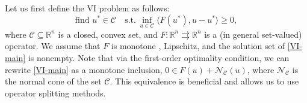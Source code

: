 \documentclass[letterpaper, 10 pt, conference]{ieeeconf}  %
\newcommand{\R}{\mathbb{R}}
\begin{document}
Let us first define the VI problem as follows:
\begin{equation}\label{VI-main}
\text{find} \,\, u^* \in \mathcal{C} \quad \text{s.t.} \, \inf\limits_{u\in \mathcal{C}}\langle F(u^*), u - u^* \rangle \geq 0,
\end{equation}
where $\mathcal{C}\subseteq\R^n$ is a closed, convex set, and $F:\R^n\rightrightarrows \R^n$ is a (in general set-valued) operator. We assume that $F$ is monotone \cite{facchinei2003finite}, Lipschitz, and the solution set of \eqref{VI-main} is nonempty. Note that via the first-order optimality condition, we can rewrite \eqref{VI-main} as a monotone inclusion, $0 \in F(u) + \mathcal{N}_{\mathcal{C}}(u)$, where $\mathcal{N}_{\mathcal{C}}$ is the normal cone of the set \(\mathcal{C}\). This equivalence is beneficial and allows us to use operator splitting methods.\\
\end{document}
